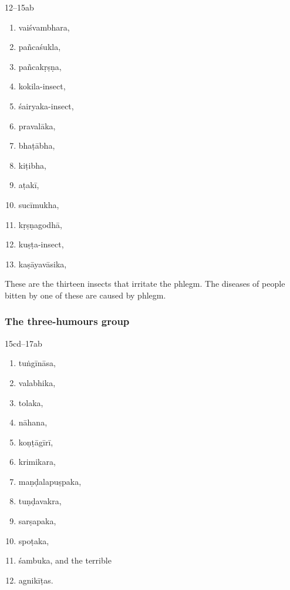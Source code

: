 \begin{translation}
\item[12--15ab]

\begin{multicols}{2}
    \begin{enumerate}
        \item \Gls{vaiśvambhara},
        \item \Gls{pañcaśukla},
        \item \Gls{pañcakṛṣṇa},
        \item \Gls{kokila-insect},
        \item \Gls{śairyaka-insect},
        \item \Gls{pravalāka},
        \item \Gls{bhaṭābha},
        \item \Gls{kiṭibha},
        \item \Gls{aṭakī},
        \item \Gls{sucīmukha},
        \item \Gls{kṛṣṇagodhā},
        \item \Gls{kuṣṭa-insect},
        \item \Gls{kaṣāyavāsika},
        \end{enumerate}
\end{multicols}

These are the thirteen  insects that irritate the phlegm.
The diseases of people bitten by one of these are caused by phlegm.

\subsubsection{The three-humours group}

\item[15cd--17ab]
\begin{multicols}{2}
    \begin{enumerate}
        \item \Gls{tuṅgīnāsa},
        \item \Gls{valabhika},
        \item \Gls{tolaka},
        \item \Gls{nāhana},
        \item \Gls{koṇṭāgīrī},
        \item \Gls{krimikara},
        \item \Gls{maṇḍalapuṣpaka},
        \item \Gls{tuṇḍavakra},
        \item \Gls{sarṣapaka},
        \item \Gls{spoṭaka},
        \item \Gls{śambuka}, and the terrible
        \item \Glspl{agnikīṭa}.
       \end{enumerate}
\end{multicols}


\end{translation}
